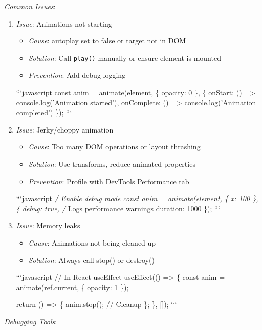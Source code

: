\documentclass[11pt]{article}
\begin{document}
\emph{Common Issues}:

\begin{enumerate}
\item \emph{Issue}: Animations not starting
\begin{itemize}
\item \emph{Cause}: autoplay set to false or target not in DOM
\item \emph{Solution}: Call \texttt{play()} manually or ensure element is mounted
\item \emph{Prevention}: Add debug logging
\end{itemize}
```javascript
const anim = animate(element, \{ opacity: 0 \}, \{
  onStart: () => console.log('Animation started'),
  onComplete: () => console.log('Animation completed')
\});
```

\item \emph{Issue}: Jerky/choppy animation
\begin{itemize}
\item \emph{Cause}: Too many DOM operations or layout thrashing
\item \emph{Solution}: Use transforms, reduce animated properties
\item \emph{Prevention}: Profile with DevTools Performance tab
\end{itemize}
```javascript
\emph{/ Enable debug mode
const anim = animate(element, \{ x: 100 \}, \{
  debug: true, /} Logs performance warnings
  duration: 1000
\});
```

\item \emph{Issue}: Memory leaks
\begin{itemize}
\item \emph{Cause}: Animations not being cleaned up
\item \emph{Solution}: Always call stop() or destroy()
\end{itemize}
```javascript
// In React useEffect
useEffect(() => \{
  const anim = animate(ref.current, \{ opacity: 1 \});

  return () => \{
    anim.stop(); // Cleanup
  \};
\}, []);
```
\end{enumerate}

\emph{Debugging Tools}:
\end{document}
